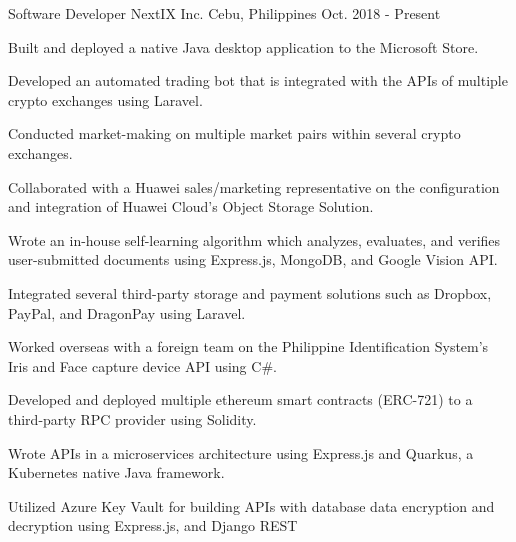 

\begin{cventries}

  \cventry
    {Software Developer} %
    {NextIX Inc.} %
    {Cebu, Philippines} %
    {Oct. 2018 - Present} %
    {
      \begin{cvitems} %
        \item {Built and deployed a native Java desktop application to the Microsoft Store.}
        \item {Developed an automated trading bot that is integrated with the APIs of multiple crypto exchanges using Laravel.}
        \item {Conducted market-making on multiple market pairs within several crypto exchanges.}
        \item {Collaborated with a Huawei sales/marketing representative on the configuration and integration of Huawei Cloud's Object Storage Solution.}
        \item {Wrote an in-house self-learning algorithm which analyzes, evaluates, and verifies user-submitted documents using Express.js, MongoDB, and Google Vision API.}
        \item {Integrated several third-party storage and payment solutions such as Dropbox, PayPal, and DragonPay using Laravel.}
        \item {Worked overseas with a foreign team on the Philippine Identification System's Iris and Face capture device API using C\#.}
        \item {Developed and deployed multiple ethereum smart contracts (ERC-721) to a third-party RPC provider using Solidity.}
        \item {Wrote APIs in a microservices architecture using Express.js and Quarkus, a Kubernetes native Java framework.}
        \item {Utilized Azure Key Vault for building APIs with database data encryption and decryption using Express.js, and Django REST \\ \\}
      \end{cvitems}
    }
\end{cventries}
